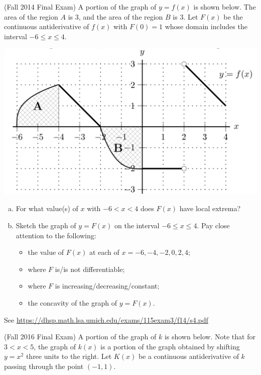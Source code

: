 \documentclass[11pt]{exam}
\begin{document}
\begin{questions}
\question (Fall 2014 Final Exam) %
	A portion of the graph of $y = f(x)$ is shown below.	 The area of the region $A$ is $3$, and the area of the region $B$ is $3$. Let $F(x)$ be the continuous antiderivative of $f(x)$ with $F(0) = 1$ whose domain includes the interval $-6 \leqslant x \leqslant 4$.
        \begin{center}
	\includegraphics[scale=0.45]{graphf}
        \end{center}
	\begin{enumerate}[(a)]
		\item For what value(s) of $x$ with $-6 < x < 4$ does $F(x)$ have local extrema?
		\item Sketch the graph of $y = F(x)$ on the interval $-6 \leqslant x \leqslant 4$.
Pay close attention to the following:
\begin{itemize}
\item the value of $F(x)$ at each of $x = -6, -4, -2, 0, 2, 4$;
\item where $F$ is/is not differentiable;
\item where $F$ is increasing/decreasing/constant;
\item the concavity of the graph of $y = F (x)$.
\end{itemize}
\end{enumerate}
\begin{solution}
  See \href{https://dhsp.math.lsa.umich.edu/exams/115exam3/f14/s4.pdf}{https://dhsp.math.lsa.umich.edu/exams/115exam3/f14/s4.pdf}
\end{solution}
\question (Fall 2016 Final Exam) %
	A portion of the graph of $k$ is shown below. Note that for $3 < x < 5$, the graph of $k(x)$ is a portion of the graph obtained by shifting $y=x^2$ three units to the right. Let $K(x)$ be a continuous antiderivative of $k$ passing through the point $(-1,1)$.

\end{questions}
\end{document}
